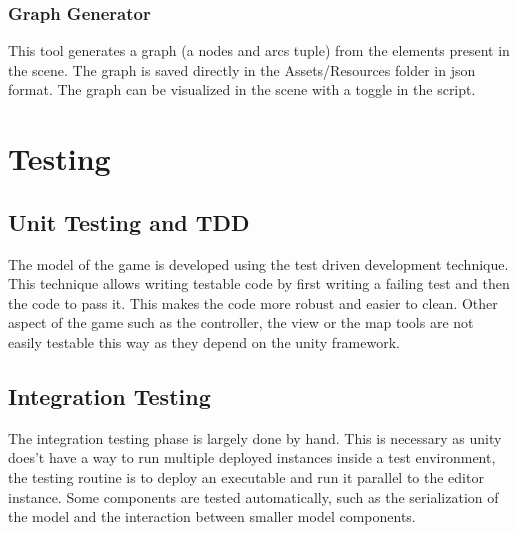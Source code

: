 \documentclass{article}
\begin{document}
\subsubsection{Graph Generator}
This tool generates a graph (a nodes and arcs tuple) from the elements present in the scene. The graph is saved directly in the Assets/Resources folder in json format. The graph can be visualized in the scene with a toggle in the script. 

\clearpage

\section{Testing}
\subsection{Unit Testing and TDD}
The model of the game is developed using the test driven development technique. This technique allows writing testable code by first writing a failing test and then the code to pass it. This makes the code more robust and easier to clean. Other aspect of the game such as the controller, the view or the map tools are not easily testable this way as they depend on the unity framework. 
\subsection{Integration Testing}
The integration testing phase is largely done by hand. This is necessary as unity does't have a way to run multiple deployed instances inside a test environment, the testing routine is to deploy an executable and run it parallel to the editor instance. Some components are tested automatically, such as the serialization of the model and the interaction between smaller model components.

\clearpage


\end{document}
